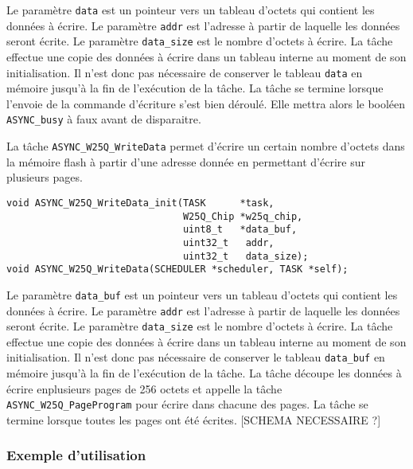 Le paramètre \texttt{data} est un pointeur vers un tableau d'octets qui contient les
données à écrire. Le paramètre \texttt{addr} est l'adresse à partir de laquelle les
données seront écrite. Le paramètre \texttt{data\_size} est le nombre d'octets à
écrire. La tâche effectue une copie des données à écrire dans un tableau interne
au moment de son initialisation. Il n'est donc pas nécessaire de conserver le tableau
\texttt{data} en mémoire jusqu'à la fin de l'exécution de la tâche. La tâche se
termine lorsque l'envoie de la commande d'écriture s'est bien déroulé. Elle mettra
alors le booléen \texttt{ASYNC\_busy} à faux avant de disparaitre.


La tâche \texttt{ASYNC\_W25Q\_WriteData} permet d'écrire un certain nombre d'octets
dans la mémoire flash à partir d'une adresse donnée en permettant d'écrire sur
plusieurs pages. 

\begin{lstlisting}[style=prog, frame=shadowbox, label={lst:ASYNC_W25Q_WriteData},
    emph={[1]ASYNC_W25Q_WriteData_init, ASYNC_W25Q_WriteData}, emphstyle={[1]\color{C}},
    emph={[2]W25Q_Chip, SCHEDULER, TASK}, emphstyle={[2]\color{E}}]
void ASYNC_W25Q_WriteData_init(TASK      *task,
                               W25Q_Chip *w25q_chip,
                               uint8_t   *data_buf,
                               uint32_t   addr,
                               uint32_t   data_size);
void ASYNC_W25Q_WriteData(SCHEDULER *scheduler, TASK *self);
\end{lstlisting}

Le paramètre \texttt{data\_buf} est un pointeur vers un tableau d'octets qui contient
les données à écrire. Le paramètre \texttt{addr} est l'adresse à partir de laquelle
les données seront écrite. Le paramètre \texttt{data\_size} est le nombre d'octets à
écrire. La tâche effectue une copie des données à écrire dans un tableau interne
au moment de son initialisation. Il n'est donc pas nécessaire de conserver le tableau
\texttt{data\_buf} en mémoire jusqu'à la fin de l'exécution de la tâche. La tâche
découpe les données à écrire enplusieurs pages de 256 octets et appelle la tâche
\texttt{ASYNC\_W25Q\_PageProgram} pour écrire dans chacune des pages. La tâche se
termine lorsque toutes les pages ont été écrites. [SCHEMA NECESSAIRE ?]

\subsubsection{Exemple d'utilisation}

